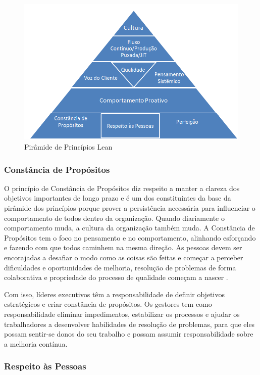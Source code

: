 \begin{figure}[h]
		\centering
		\label{fig02}
			\includegraphics[scale=0.7]{figuras/principioslean.png}
		\caption{Pirâmide de Princípios Lean}
\end{figure}

\subsubsection[Constância de Propósitos]{Constância de Propósitos}

O princípio de Constância de Propósitos diz respeito a manter a clareza dos objetivos importantes de longo prazo e é um dos constituintes da base da pirâmide dos princípios porque prover a persistência necessária para influenciar o comportamento de todos dentro da organização. Quando diariamente o comportamento muda, a cultura da organização também muda. A Constância de Propósitos tem o foco no pensamento e no comportamento, alinhando esforçando e fazendo com que todos caminhem na mesma direção. As pessoas devem ser encorajadas a desafiar o modo como as coisas são feitas e começar a perceber dificuldades e oportunidades de melhoria, resolução de problemas de forma colaborativa e propriedade do processo de qualidade começam a nascer \cite{bell2011}.

Com isso, líderes executivos têm a responsabilidade de definir objetivos estratégicos e criar constância de propósitos. Os gestores tem como responsabilidade eliminar impedimentos, estabilizar os processos e ajudar os trabalhadores a desenvolver habilidades de resolução de problemas, para que eles possam sentir-se donos do seu trabalho e possam assumir responsabilidade sobre a melhoria contínua. 


\subsubsection[Respeito às Pessoas]{Respeito às Pessoas}

